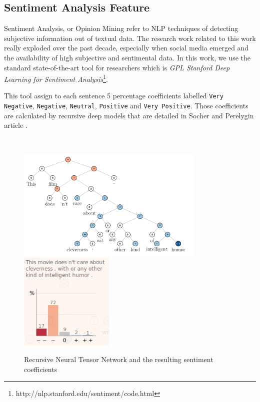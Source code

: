 \subsection{Sentiment Analysis Feature}
Sentiment Analysis, or Opinion Mining refer to NLP techniques of detecting subjective information out of textual data. The research work related to this work really exploded over the past decade, especially when social media emerged and the availability of high subjective and sentimental data. In this work, we use the standard state-of-the-art tool for researchers which is \emph{GPL Stanford Deep Learning for Sentiment Analysis}\footnote{http://nlp.stanford.edu/sentiment/code.html}. 

This tool assign to each sentence 5 percentage coefficients labelled \texttt{Very Negative}, \texttt{Negative}, \texttt{Neutral}, \texttt{Positive} and \texttt{Very Positive}. Those coefficients are calculated by recursive deep models that are detailed in Socher and Perelygin article \cite{Socher_recursivedeep}.

\
\begin{figure}[H]
    \centering
    \includegraphics[width=0.8\textwidth]{fig/sentimenttree.png}
    \includegraphics[width=0.4\textwidth]{fig/sentimentcoeff.png}
    \caption[Short caption]{ Recursive Neural Tensor Network and the resulting sentiment coefficients}
    \label{fig:subclause}
\end{figure}

